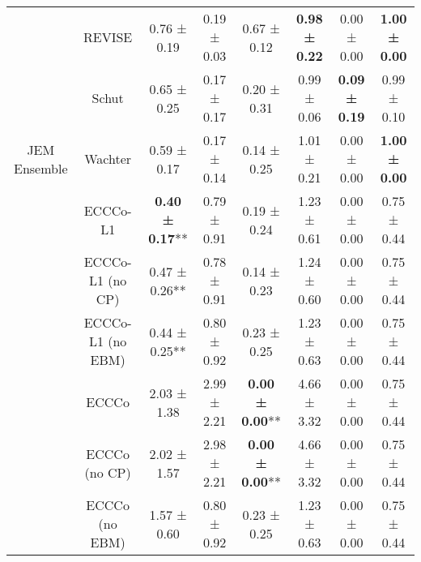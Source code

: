 \begin{table}
{\begin{tabular}[t]{cccccccc}
 & REVISE & 0.76 ± 0.19\hphantom{*}\hphantom{*} & 0.19 ± 0.03\hphantom{*}\hphantom{*} & 0.67 ± 0.12\hphantom{*}\hphantom{*} & \textbf{0.98 ± 0.22}\hphantom{*}\hphantom{*} & 0.00 ± 0.00\hphantom{*}\hphantom{*} & \textbf{1.00 ± 0.00}\hphantom{*}\hphantom{*}\\

 & Schut & 0.65 ± 0.25\hphantom{*}\hphantom{*} & 0.17 ± 0.17\hphantom{*}\hphantom{*} & 0.20 ± 0.31\hphantom{*}\hphantom{*} & 0.99 ± 0.06\hphantom{*}\hphantom{*} & \textbf{0.09 ± 0.19}\hphantom{*}\hphantom{*} & 0.99 ± 0.10\hphantom{*}\hphantom{*}\\

\multirow[t]{-9}{*}{\centering\arraybackslash JEM Ensemble} & Wachter & 0.59 ± 0.17\hphantom{*}\hphantom{*} & 0.17 ± 0.14\hphantom{*}\hphantom{*} & 0.14 ± 0.25\hphantom{*}\hphantom{*} & 1.01 ± 0.21\hphantom{*}\hphantom{*} & 0.00 ± 0.00\hphantom{*}\hphantom{*} & \textbf{1.00 ± 0.00}\hphantom{*}\hphantom{*}\\
\cmidrule{1-8}
 & ECCCo-L1 & \textbf{0.40 ± 0.17}** & 0.79 ± 0.91\hphantom{*}\hphantom{*} & 0.19 ± 0.24\hphantom{*}\hphantom{*} & 1.23 ± 0.61\hphantom{*}\hphantom{*} & 0.00 ± 0.00\hphantom{*}\hphantom{*} & 0.75 ± 0.44\hphantom{*}\hphantom{*}\\

 & ECCCo-L1 (no CP) & 0.47 ± 0.26** & 0.78 ± 0.91\hphantom{*}\hphantom{*} & 0.14 ± 0.23\hphantom{*}\hphantom{*} & 1.24 ± 0.60\hphantom{*}\hphantom{*} & 0.00 ± 0.00\hphantom{*}\hphantom{*} & 0.75 ± 0.44\hphantom{*}\hphantom{*}\\

 & ECCCo-L1 (no EBM) & 0.44 ± 0.25** & 0.80 ± 0.92\hphantom{*}\hphantom{*} & 0.23 ± 0.25\hphantom{*}\hphantom{*} & 1.23 ± 0.63\hphantom{*}\hphantom{*} & 0.00 ± 0.00\hphantom{*}\hphantom{*} & 0.75 ± 0.44\hphantom{*}\hphantom{*}\\

 & ECCCo & 2.03 ± 1.38\hphantom{*}\hphantom{*} & 2.99 ± 2.21\hphantom{*}\hphantom{*} & \textbf{0.00 ± 0.00}** & 4.66 ± 3.32\hphantom{*}\hphantom{*} & 0.00 ± 0.00\hphantom{*}\hphantom{*} & 0.75 ± 0.44\hphantom{*}\hphantom{*}\\

 & ECCCo (no CP) & 2.02 ± 1.57\hphantom{*}\hphantom{*} & 2.98 ± 2.21\hphantom{*}\hphantom{*} & \textbf{0.00 ± 0.00}** & 4.66 ± 3.32\hphantom{*}\hphantom{*} & 0.00 ± 0.00\hphantom{*}\hphantom{*} & 0.75 ± 0.44\hphantom{*}\hphantom{*}\\

 & ECCCo (no EBM) & 1.57 ± 0.60\hphantom{*}\hphantom{*} & 0.80 ± 0.92\hphantom{*}\hphantom{*} & 0.23 ± 0.25\hphantom{*}\hphantom{*} & 1.23 ± 0.63\hphantom{*}\hphantom{*} & 0.00 ± 0.00\hphantom{*}\hphantom{*} & 0.75 ± 0.44\hphantom{*}\hphantom{*}\\


\end{tabular}}
\end{table}

